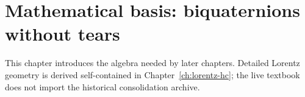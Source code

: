 
\chapter{Mathematical basis: biquaternions without tears}
This chapter introduces the algebra needed by later chapters.  Detailed Lorentz geometry is derived self-contained in Chapter~\ref{ch:lorentz-hc}; the live textbook does not import the historical consolidation archive.
